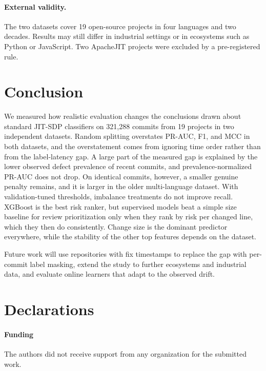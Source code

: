 \documentclass[11pt,a4paper]{article}
\begin{document}
\paragraph{External validity.} The two datasets cover 19 open-source projects in four languages and two decades. Results may still differ in industrial settings or in ecosystems such as Python or JavaScript. Two ApacheJIT projects were excluded by a pre-registered rule.

\section{Conclusion}\label{sec:conclusion}

We measured how realistic evaluation changes the conclusions drawn about standard JIT-SDP classifiers on 321{,}288 commits from 19 projects in two independent datasets. Random splitting overstates PR-AUC, F1, and MCC in both datasets, and the overstatement comes from ignoring time order rather than from the label-latency gap. A large part of the measured gap is explained by the lower observed defect prevalence of recent commits, and prevalence-normalized PR-AUC does not drop. On identical commits, however, a smaller genuine penalty remains, and it is larger in the older multi-language dataset. With validation-tuned thresholds, imbalance treatments do not improve recall. XGBoost is the best risk ranker, but supervised models beat a simple size baseline for review prioritization only when they rank by risk per changed line, which they then do consistently. Change size is the dominant predictor everywhere, while the stability of the other top features depends on the dataset.

Future work will use repositories with fix timestamps to replace the gap with per-commit label masking, extend the study to further ecosystems and industrial data, and evaluate online learners that adapt to the observed drift.

\section*{Declarations}

\paragraph{Funding} The authors did not receive support from any organization for the submitted work.
\end{document}
